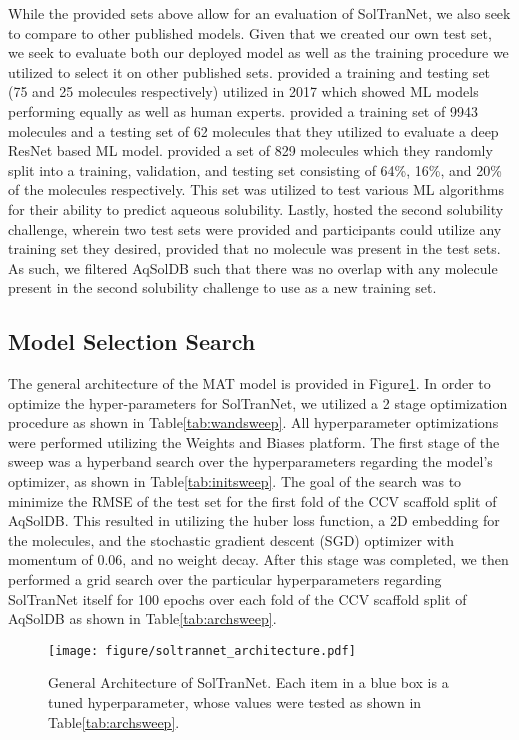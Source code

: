 \documentclass[journal=jmcmar,manuscript=article]{achemso}
\begin{document}
While the provided sets above allow for an evaluation of SolTranNet, we also seek to compare to other published models. Given that we created our own test set, we seek to evaluate both our deployed model as well as the training procedure we utilized to select it on other published sets.
\citet{boobier} provided a training and testing set (75 and 25 molecules respectively) utilized in 2017 which showed ML models performing equally as well as human experts.
\citet{cui} provided a training set of 9943 molecules and a testing set of 62 molecules that they utilized to evaluate a deep ResNet based ML model.
\citet{lovric} provided a set of 829 molecules which they randomly split into a training, validation, and testing set consisting of 64\%, 16\%, and 20\% of the molecules respectively.
This set was utilized to test various ML algorithms for their ability to predict aqueous solubility.
Lastly, \citet{llinas} hosted the second solubility challenge, wherein two test sets were provided and participants could utilize any training set they desired, provided that no molecule was present in the test sets.
As such, we filtered AqSolDB such that there was no overlap with any molecule present in the second solubility challenge to use as a new training set.

\subsection{Model Selection Search}
The general architecture of the MAT model is provided in Figure\ref{fig:architecture}.
In order to optimize the hyper-parameters for SolTranNet, we utilized a 2 stage optimization procedure as shown in Table\ref{tab:wandsweep}.
All hyperparameter optimizations were performed utilizing the Weights and Biases platform\cite{wandb}.
The first stage of the sweep was a hyperband search over the hyperparameters regarding the model's optimizer, as shown in Table\ref{tab:initsweep}. The goal of the search was to minimize the RMSE of the test set for the first fold of the CCV scaffold split of AqSolDB.
This resulted in utilizing the huber loss function, a 2D embedding for the molecules, and the stochastic gradient descent (SGD) optimizer with momentum of 0.06, and no weight decay.
After this stage was completed, we then performed a grid search over the particular hyperparameters regarding SolTranNet itself for 100 epochs over each fold of the CCV scaffold split of AqSolDB as shown in Table\ref{tab:archsweep}.

\begin{figure}[tb]
    \centering
    \texttt{[image: figure/soltrannet\_architecture.pdf]}
    \caption{General Architecture of SolTranNet. Each item in a blue box is a tuned hyperparameter, whose values were tested as shown in Table\ref{tab:archsweep}.}
    \label{fig:architecture}
\end{figure}
\end{document}
